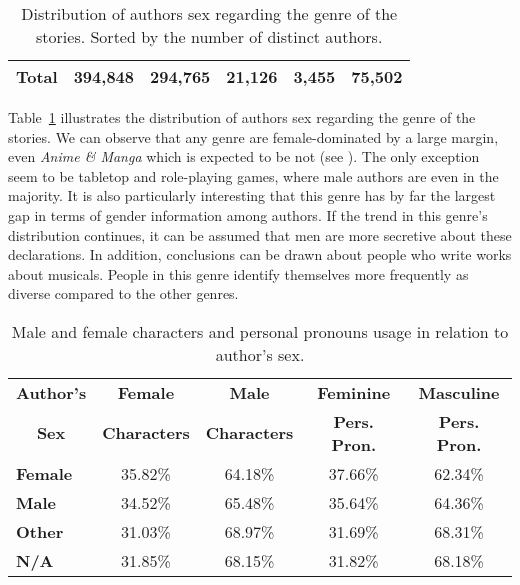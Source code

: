 \begin{table}[htb]
\begin{tabular}{lrrrrr}
        \midrule
        \textbf{Total}                & 394,848 & 294,765                         & 21,126                          & 3,455                          & 75,502                          \\
        \bottomrule
    \end{tabular}
    \caption[Distribution of authors sex regarding the genre of the stories.]{Distribution of authors sex regarding the genre of the stories. Sorted by the number of distinct authors.}
    \label{tab:user-sex-per-genre}
\end{table}

Table~\ref{tab:user-sex-per-genre} illustrates the distribution of authors sex regarding the genre of the stories.
We can observe that any genre are female-dominated by a large margin, even \emph{Anime \& Manga} which is expected to be not (see \citet{Malone2010FromEconomically}).
The only exception seem to be tabletop and role-playing games, where male authors are even in the majority.
It is also particularly interesting that this genre has by far the largest gap in terms of gender information among authors.
If the trend in this genre's distribution continues, it can be assumed that men are more secretive about these declarations.
In addition, conclusions can be drawn about people who write works about musicals.
People in this genre identify themselves more frequently as diverse compared to the other genres.

\begin{table}[htb]
    \renewcommand{\arraystretch}{1.5}
    \centering
    \begin{tabular}{lcccc}
        \toprule
        \multicolumn{1}{c}{\textbf{Author's}} &
        \textbf{Female} &
        \textbf{Male} &
        \textbf{Feminine} &
        \textbf{Masculine} \\[-1.5ex]
        \multicolumn{1}{c}{\textbf{Sex}} &
        \textbf{Characters} &
        \textbf{Characters} &
        \textbf{Pers. Pron.} &
        \textbf{Pers. Pron.} \\
        \midrule
        \textbf{Female} & 35.82\% & 64.18\% & 37.66\% & 62.34\% \\
        \textbf{Male}   & 34.52\% & 65.48\% & 35.64\% & 64.36\% \\
        \textbf{Other}  & 31.03\% & 68.97\% & 31.69\% & 68.31\% \\
        \textbf{N/A}    & 31.85\% & 68.15\% & 31.82\% & 68.18\% \\
        \bottomrule
    \end{tabular}
    \caption[Male and female characters and personal pronouns usage in relation to author's sex.]{Male and female characters and personal pronouns usage in relation to author's sex.}
    \label{tab:gender-relation-authors-sex}
\end{table}

